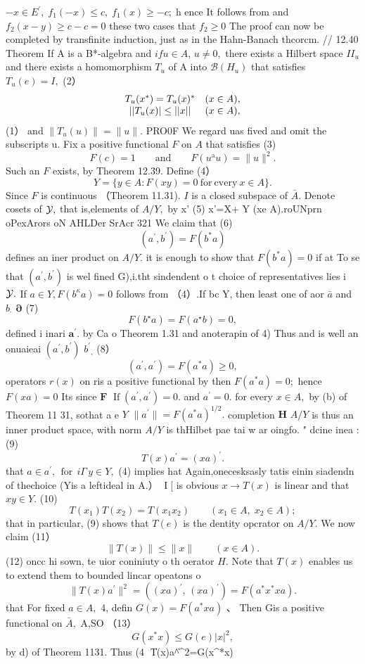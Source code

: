 $-x\in E^{\prime},\;f_{1}(-x)\leq c,\;f_{1}(x)\geq-c;\;\mathrm{h}$ ence It follows from and $f_{2}(x-y)\geq c-c=0$ these two cases that $f_{2}\geq0$ The proof can now be completed by transfinite induction, just as in the Hahn-Banach thcorcm. // 12.40 Theorem If A is a B*-algebra and $i f u\in A,\,u\neq0,$ there exists a Hilbert space $I I_{u}$ and there exists a homomorphism $T_{u}$ of A into ${\mathcal{B}}(H_{u})$ that satisfies $T_{u}(e)=I,$ (2） $$ \begin{array}{c c c}{{T_{u}(x^{\ast})=T_{u}(x)^{\ast}}}&{{(x\in A),}}\\ {{||T_{u}(x)|\le||x||}}&{{(x\in A),}}\end{array} $$ (1） and $\|T_{u}(u)\|=\|u\|.$ PRO0F We regard uas fived and omit the subscripts u. Fix a positive functional ${\mathbf{}}F$ on $\scriptstyle A$ that satisfies (3) $$ F(c)=1\qquad\mathrm{and}\qquad F(u^{\mathrm{a}}u)=\|u\|^{2}. $$ Such an ${\mathbf{}}F$ exists, by Theorem 12.39. Define (4） $$ Y=\{y\in A\colon F(x y)=0{\mathrm{~for~cvery~}}x\in A\}. $$ Since ${\mathbf{}}F$ is continuous （Theorem 11.31). $\boldsymbol{\mathit{I}}$ is a closed subspace of ${\bar{A}}.$ Denote cosets of ${\cal{Y}},$ that is,elements of $A/Y,$ by x' (5) x'=X+ Y (xe A).roUNprn oPexArors oN AHLDer SrAcr 321 We claim that (6) $$ (a^{\prime},b^{\prime})=F(b^{*}a) $$ defines an iner product on $A/Y.$ it is enough to show that $F(b^{*}a)=0$ if at To se that $(a^{\prime},b^{\prime})$ is wel fined G),i.tht sindendent o t choice of representatives lies i ${\cal{Y}}.$ If $a\in Y,F(b^{\kappa}a)=0$ follows from （4）.If bc Y, then least one of aor $\bar{a}$ and $b_{\cdot}$ $\boldsymbol{\partial}$ (7) $$ F(b^{\star}a)=F(a^{\star}b)=0, $$ defined i inari ${\boldsymbol{a}}^{\prime}.$ by Ca o Theorem 1.31 and anoterapin of 4) Thus and is well an onuaieai $(a^{\prime},b^{\prime})$ ${b^{\prime}}_{,}$ (8） $$ (a^{\prime},a^{\prime})=F(a^{*}a)\geq0, $$ operators $\textstyle r(x)$ on ris a positive functional by then $F(a^{*}a)=0;$ hence $F(x a)=0$ Its since ${\boldsymbol{F}}$ $\operatorname{If}\left(a^{\prime},a^{\prime}\right)=0.$ and $a^{\prime}=0.$ for every $x\in A,$ by (b) of Theorem 11 31, sothat a e ${\mathbf{}}Y$ $\|a^{\prime}\|=F(a^{*}a)^{1/2}.$ completion ${\boldsymbol{H}}$ $A/Y$ is thus an inner product space, with norm $A/Y$ is thHilbet pae tai w ar oingfo. " dcine inea :(9) $$ T(x)a^{\prime}=(x a)^{\prime}. $$ that $a\in a^{\prime},\,\operatorname{for}\,i\Gamma\,y\in Y,$ (4) implies hat Again,onecesksasly tatis einin siadendn of thechoice (Yis a leftideal in A.） $\operatorname{I}\! [$ is obvious $x\to T(x)$ is linear and that $x y\in Y.$ (10) $$ T(x_{1})T(x_{2})=T(x_{1}x_{2})\qquad(x_{1}\in A,\;x_{2}\in A); $$ that in particular, (9) shows that $T(e)$ is the dentity opcrator on $A/Y.$ We now claim (11） $$ \|T(x)\|\leq\|x\|\qquad(x\in A). $$ (12) oncc hi sown, te uior coniniuty o th oerator $H.$ Note that $\scriptstyle T(x)$ enables us to extend them to bounded lincar opeatons o $$ \|T(x)a^{\prime}\|^{2}=((x a)^{\prime},\,(x a)^{\prime})=F(a^{*}x^{*}x a). $$ that For fixed $a\in A,$ 4, defin $G(x)=F(a^{*}x a)$ 、 Then Gis a positive functional on ${\bar{A}},$ A,SO （13） $$ G(x^{\ast}x)\le G(e)\vert x\vert^{2}, $$ by d) of Theorem 1131. Thus (4 $$ \|T(x)a^{\prime}\|^{2}=G(x^{*}x)\leq 